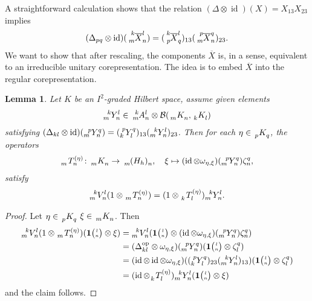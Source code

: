 \documentclass[11pt]{article}
\DeclareMathOperator{\id}{id}
\DeclareMathOperator{\op}{\mathrm{op}}
\newcommand{\Grt}[3]{#1{\tiny {\begin{pmatrix} #2\\#3\end{pmatrix}}}}
\newcommand{\UnitC}[2]{\Grt{\mathbf{1}}{#1}{#2}}
\newcommand{\Gr}[5]{\,\tensor*[^{#2}_{#4}]{#1}{^{#3}_{#5}}}%
\newcommand{\Grd}[3]{\Gr{#1}{}{}{#2}{#3}}
\newtheorem{Lem}[Theorem]{Lemma}
\theoremstyle{definition}
\numberwithin{equation}{section}
\begin{document}
A straightforward calculation shows that the relation $(\Delta\otimes \id)(X)=X_{13}X_{23}$ implies
  \begin{align*}
    (\Delta_{pq} \otimes \id)(\Gr{\overline{X}}{k}{l}{m}{n}) =
     (\Gr{\overline{X}}{k}{l}{p}{q})_{13}(\Gr{\overline{X}}{p}{q}{m}{n})_{23}.
  \end{align*}
We want to show that after rescaling, the components  $\overline{X}$ is, in a sense, equivalent to an irreducible unitary  corepresentation. The idea is to embed
$\overline{X}$ into the regular corepresentation.
\begin{Lem} \label{lem:construct-intertwiner} Let $K$ be an $I^{2}$-graded Hilbert space, assume
  given elements
  \begin{align*}
    \Gr{Y}{k}{l}{m}{n}\in \Gr{A}{k}{l}{m}{n} \otimes \mathcal{B}(\Grd{K}{m}{n},\Grd{K}{k}{l})
  \end{align*}
   satisfying $    (\Delta_{kl} \otimes \id)(\Gr{Y}{p}{q}{m}{n}) =
     (\Gr{Y}{p}{q}{k}{l})_{13}(\Gr{Y}{k}{l}{m}{n})_{23}
$. Then for each $\eta\in \Grd{K}{p}{q}$,  the operators
\begin{align*}
  \Gr{T}{}{(\eta)}{m}{n} \colon
\Grd{K}{m}{n} \to  \Grd{(H_{h})}{m}{n}, \quad \xi \mapsto (\id \otimes \omega_{\eta,\xi})(\Gr{Y}{p}{q}{m}{n}) \zeta^{q}_{n},
\end{align*}
satisfy
  \begin{align*}
    \Gr{V}{k}{l}{m}{n}(1\otimes \Gr{T}{}{(\eta)}{m}{n}) = (1 \otimes
    \Gr{T}{}{(\eta)}{k}{l})\Gr{Y}{k}{l}{m}{n}.
  \end{align*}
\end{Lem}
\begin{proof}
Let $\eta \in \Grd{K}{p}{q}$
  $\xi \in \Grd{K}{m}{n}$. Then
  \begin{align*}
    \Gr{V}{k}{l}{m}{n}(1\otimes \Gr{T}{}{(\eta)}{m}{n})(\UnitC{l}{n}\otimes \xi) &= \Gr{V}{k}{l}{m}{n}(\UnitC{l}{n}
    \otimes (\id \otimes \omega_{\eta,\xi})(\Gr{Y}{p}{q}{m}{n})\zeta^{q}_{n}) \\ &= (\Delta_{kl}^{\op}    \otimes
    \omega_{\eta,\xi})(\Gr{Y}{p}{q}{m}{n})(\UnitC{l}{n}\otimes \zeta^{q}_{l}) \\
    &= (\id \otimes \id \otimes \omega_{\eta,\xi})((\Gr{Y}{p}{q}{k}{l})_{23}(\Gr{Y}{k}{l}{m}{n})_{13})(\UnitC{l}{n}\otimes
    \zeta^{q}_{l}) \\
    &= (\id \otimes \Gr{T}{}{(\eta)}{k}{l})\Gr{Y}{k}{l}{m}{n}(\UnitC{l}{n}\otimes \xi)
  \end{align*}
and the claim follows.
\end{proof}
\end{document}
